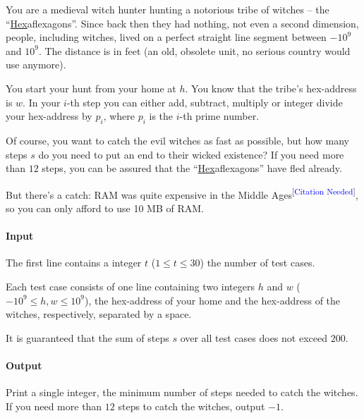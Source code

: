 



\makeheader

You are a medieval witch hunter hunting a notorious tribe of witches -- the “\underline{Hex}aflexagons”.
Since back then they had nothing, not even a second dimension, people, including witches, lived
on a perfect straight line segment between $-10^9$ and $10^9$. The distance is in feet (an old, obsolete unit,
no serious country would use anymore).

You start your hunt from your home at $h$. You know that the tribe's hex-address is $w$.
In your $i$-th step you can either add, subtract, multiply or integer divide your hex-address by $p_i$,
where $p_i$ is the $i$-th prime number.

Of course, you want to catch the evil witches as fast as possible, but
how many steps $s$ do you need to put an end to their wicked existence?
If you need more than $12$ steps, you can be assured that
the “\underline{Hex}aflexagons” have fled already.

But there's a catch:
RAM was quite expensive in the Middle Ages\textsuperscript{[\textcolor{blue}{Citation Needed}]},
so you can only afford to use 10 MB of RAM.

\paragraph*{Input}

The first line contains a integer $t$ ($1\leq t\leq 30$) the number of test cases.

Each test case consists of one line containing two integers%
$h$ and $w$ ($-10^9 \leq h, w \leq 10^9$), the hex-address of your home and the hex-address of the witches, respectively, separated by a space.

It is guaranteed that the sum of steps $s$ over all test cases does not exceed $200$.

\paragraph*{Output}

Print a single integer, the minimum number of steps needed to catch the witches.
If you need more than $12$ steps to catch the witches, output $-1$.

\begin{samples}
\end{samples}

